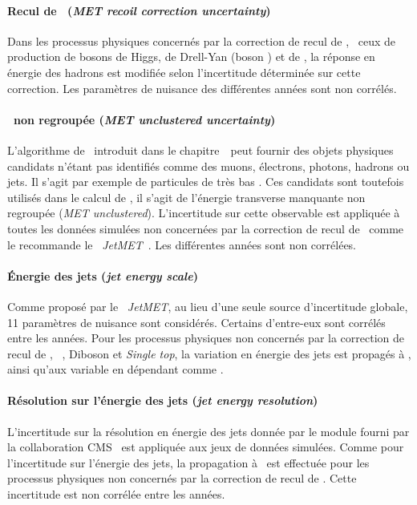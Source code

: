 \paragraph{Recul de \MET\ (\emph{MET recoil correction uncertainty})}
Dans les processus physiques concernés par la correction de recul de \MET,
\ie\ ceux de production de bosons de Higgs, de Drell-Yan (boson \Zboson) et de \Wjets,
la réponse en énergie des hadrons est modifiée selon l'incertitude déterminée sur cette correction.
Les paramètres de nuisance des différentes années sont non corrélés.
\paragraph{\MET\ non regroupée (\emph{MET unclustered uncertainty})}
L'algorithme de \PF\ introduit dans le chapitre~\ peut fournir des objets physiques candidats n'étant pas identifiés comme des muons, électrons, photons, hadrons ou jets.
Il s'agit par exemple de particules de très bas \pT.
Ces candidats sont toutefois utilisés dans le calcul de \MET, il s'agit de l'énergie transverse manquante non regroupée (\emph{MET unclustered}).
L'incertitude sur cette observable est appliquée à toutes les données simulées non concernées par la correction de recul de \MET\ comme le recommande le \POG\ \emph{JetMET}~\cite{MET_corrections}.
Les différentes années sont non corrélées.
\paragraph{Énergie des jets (\emph{jet energy scale})}
Comme proposé par le \POG\ \emph{JetMET}, au lieu d'une seule source d'incertitude globale, 11 paramètres de nuisance sont considérés.
Certains d'entre-eux sont corrélés entre les années.
Pour les processus physiques non concernés par la correction de recul de \MET, \ie\ \ttbar, Diboson et \emph{Single top}, la variation en énergie des jets est propagés à \MET, ainsi qu'aux variable en dépendant comme \mTtot.
\paragraph{Résolution sur l'énergie des jets (\emph{jet energy resolution})}
L'incertitude sur la résolution en énergie des jets donnée par le module fourni par la collaboration CMS~\cite{JetResolution} est appliquée aux jeux de données simulées.
Comme pour l'incertitude sur l'énergie des jets, la propagation à \MET\ est effectuée pour les processus physiques non concernés par la correction de recul de \MET.
Cette incertitude est non corrélée entre les années.
